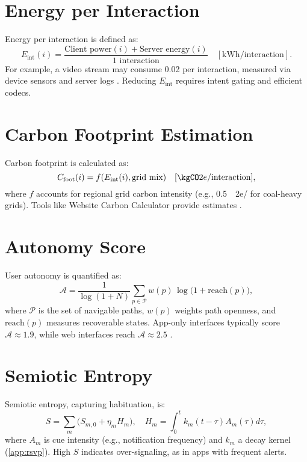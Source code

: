 \documentclass[openany]{book}
\newcommand{\Sent}{S} %
\newcommand{\Eint}{E_{\mathrm{int}}} %
\newcommand{\Cfoot}{C_{\mathrm{foot}}} %
\newcommand{\Auton}{\mathcal{A}} %
\newcommand{\kWh}{\mathrm{kWh}}
\begin{document}
\section{Energy per Interaction}
\label{sec:metrics-energy}
Energy per interaction is defined as:
\begin{equation}
\label{eq:Eint}
\Eint(i) = \frac{\text{Client power}(i) + \text{Server energy}(i)}{\text{1 interaction}} \quad [\kWh/\text{interaction}].
\end{equation}
For example, a video stream may consume \SI{0.02}{\kWh} per interaction, measured via device sensors and server logs \citep{extentia2024}. Reducing $\Eint$ requires intent gating and efficient codecs.

\section{Carbon Footprint Estimation}
\label{sec:metrics-carbon}
Carbon footprint is calculated as:
\begin{equation}
\label{eq:Cfoot}
\Cfoot(i) = f(\Eint(i), \text{grid mix}) \quad [\kgCO2e/\text{interaction}],
\end{equation}
where $f$ accounts for regional grid carbon intensity (e.g., \SI{0.5}{\kgCO2e/\kWh} for coal-heavy grids). Tools like Website Carbon Calculator provide estimates \citep{colak2024}.

\section{Autonomy Score}
\label{sec:metrics-autonomy}
User autonomy is quantified as:
\begin{equation}
\label{eq:metrics-autonomy}
\Auton = \frac{1}{\log(1+N)}\sum_{p\in \mathcal{P}} w(p)\,\log\big(1+\mathrm{reach}(p)\big),
\end{equation}
where $\mathcal{P}$ is the set of navigable paths, $w(p)$ weights path openness, and $\mathrm{reach}(p)$ measures recoverable states. App-only interfaces typically score $\Auton \approx 1.9$, while web interfaces reach $\Auton \approx 2.5$ \citep{doctorow2022}.

\section{Semiotic Entropy}
\label{sec:metrics-entropy}
Semiotic entropy, capturing habituation, is:
\begin{equation}
\label{eq:metrics-S}
\Sent = \sum_m \big(S_{m,0} + \eta_m H_m\big), \quad H_m = \int_0^t k_m(t-\tau) A_m(\tau) d\tau,
\end{equation}
where $A_m$ is cue intensity (e.g., notification frequency) and $k_m$ a decay kernel (\cref{app:rsvp}). High $\Sent$ indicates over-signaling, as in apps with frequent alerts.
\end{document}
